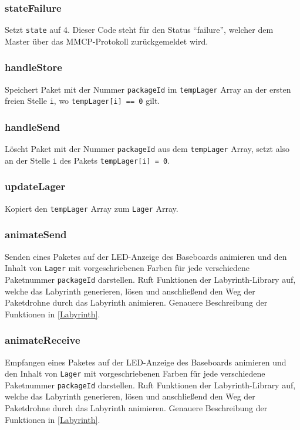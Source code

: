 \subsubsection*{stateFailure}
Setzt \texttt{state} auf 4. Dieser Code steht für den Status \enquote{failure}, welcher dem Master über das MMCP-Protokoll zurückgemeldet wird.

\subsubsection*{handleStore}
Speichert Paket mit der Nummer \texttt{packageId} im \texttt{tempLager} Array an der ersten freien Stelle \texttt{i}, wo \texttt{tempLager[i] == 0} gilt.

\subsubsection*{handleSend}
Löscht Paket mit der Nummer \texttt{packageId} aus dem \texttt{tempLager} Array, setzt also an der Stelle \texttt{i} des Pakets \texttt{tempLager[i] = 0}.

\subsubsection*{updateLager}
Kopiert den \texttt{tempLager} Array zum \texttt{Lager} Array.

\subsubsection*{animateSend}
Senden eines Paketes auf der LED-Anzeige des Baseboards animieren und den Inhalt von \texttt{Lager} mit vorgeschriebenen Farben für jede verschiedene Paketnummer \texttt{packageId} darstellen. Ruft Funktionen der Labyrinth-Library auf, welche das Labyrinth generieren, lösen und anschließend den Weg der Paketdrohne durch das Labyrinth animieren. Genauere Beschreibung der Funktionen in \ref{Labyrinth}.

\subsubsection*{animateReceive}
Empfangen eines Paketes auf der LED-Anzeige des Baseboards animieren und den Inhalt von \texttt{Lager} mit vorgeschriebenen Farben für jede verschiedene Paketnummer \texttt{packageId} darstellen. Ruft Funktionen der Labyrinth-Library auf, welche das Labyrinth generieren, lösen und anschließend den Weg der Paketdrohne durch das Labyrinth animieren. Genauere Beschreibung der Funktionen in \ref{Labyrinth}.

